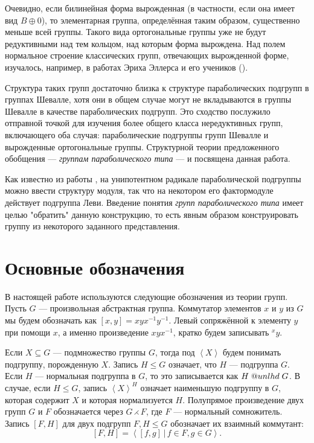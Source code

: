 \documentclass[12pt]{matmex-diploma}
\makeatletter
\newcommand{\slunlhd}{%
  \mathrel{\mathpalette\sl@unlhd\relax}%
}
\newcommand{\sl@unlhd}[2]{%
  \sbox\z@{$#1\lhd$}%
  \sbox\tw@{$#1\leqslant$}%
  \dimen@=\ht\tw@
  \advance\dimen@-\ht\z@
  \ifx#1\displaystyle
    \advance\dimen@ .2pt
  \else
    \ifx#1\textstyle
      \advance\dimen@ .2pt
    \fi
  \fi
  \ooalign{\raisebox{\dimen@}{$\m@th#1\lhd$}\cr$\m@th#1\leqslant$\cr}%
}
\theoremstyle{mystyleni}
\theoremstyle{mystyle}
\renewcommand{\le}{\leqslant}
\renewcommand{\trianglelefteq}{\slunlhd}
\makeatother
\begin{document}
Очевидно, если билинейная форма вырожденная (в частности, если она имеет вид $B \oplus 0$), то элементарная группа, определённая таким образом, существенно меньше всей группы.
Такого вида ортогональные группы уже не будут редуктивными над тем кольцом, над которым форма вырождена.
Над полем нормальное строение классических групп, отвечающих вырожденной форме, изучалось, например, в работах Эриха Эллерса и его учеников (\cite{Ellers1984}).

Структура таких групп достаточно близка к структуре параболических подгрупп в группах Шевалле, хотя они в общем случае могут не вкладываются в группы Шевалле в качестве параболических подгрупп. Это сходство послужило отправной точкой для изучения более общего класса нередуктивных групп, включающего оба случая: параболические подгруппы групп Шевалле и вырожденные ортогональные группы. Структурной теории предложенного обобщения --- \emph{группам параболического типа} --- и посвящена данная работа.

Как известно из работы \citep{Azad1990}, на унипотентном радикале параболической подгруппы можно ввести структуру модуля, так что на некотором его фактормодуле действует подгруппа Леви. Введение понятия \emph{групп параболического типа} имеет целью "обратить" данную конструкцию, то есть явным образом конструировать группу из некоторого заданного представления.

\section{Основные обозначения}

В настоящей работе используются следующие обозначения из теории групп.\linebreak
Пусть $G$ --- произвольная абстрактная группа. Коммутатор элементов $x$ и $y$ из $G$ мы будем обозначать как $[x,y]=x y x^{-1} y^{-1}$.
Левый сопряжённой к элементу $y$ при помощи $x$, а именно произведение $x y x^{-1}$, кратко будем записывать ${}^x y$.

Если $X \subseteq G$ --- подмножество группы $G$, тогда под $\left<X\right>$ будем понимать подгруппу, порожденную $X$.
Запись $H\le G$ означает, что $H$ --- подгруппа $G$.
Если $H$ --- нормальная подгруппа в $G$, то это записывается как $H \trianglelefteq G$. В случае, если $H \le G$, запись $\left<X\right>^H$ означает наименьшую подгруппу в $G$, которая содержит $X$ и которая нормализуется $H$.
Полупрямое произведение двух групп $G$ и $F$ обозначается через $G\rightthreetimes F$, где $F$ --- нормальный сомножитель.
Запись $[F,H]$ для двух подгрупп $F,H \le G$ обозначает их взаимный коммутант:
$$ [F,H] = \left<[f,g] \, | \, f\in F, g \in G \right> .$$
\end{document}

